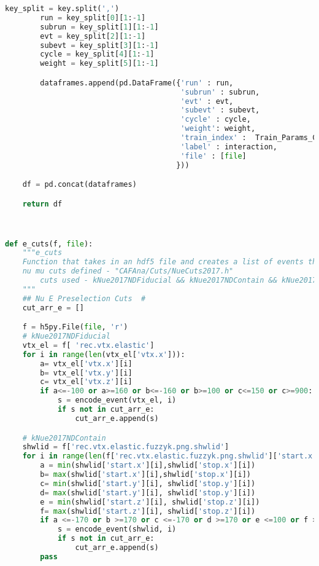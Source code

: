 \begin{lstlisting}[language=Python]
        key_split = key.split(',')
        run = key_split[0][1:-1]
        subrun = key_split[1][1:-1]
        evt = key_split[2][1:-1]
        subevt = key_split[3][1:-1]
        cycle = key_split[4][1:-1]
        weight = key_split[5][1:-1]

        dataframes.append(pd.DataFrame({'run' : run,
                                        'subrun' : subrun,
                                        'evt' : evt,
                                        'subevt' : subevt,
                                        'cycle' : cycle,
                                        'weight': weight,
                                        'train_index' :  Train_Params_Cut[key][0],
                                        'label' : interaction,
                                        'file' : [file]
                                       }))

    df = pd.concat(dataframes)

    return df



def e_cuts(f, file):
    """e_cuts
    Function that takes in an hdf5 file and creates a list of events that do not pass the nu e cuts:
    nu mu cuts defined - "CAFAna/Cuts/NueCuts2017.h"
        cuts used - kNue2017NDFiducial && kNue2017NDContain && kNue2017NDFrontPlanes
    """
    ## Nu E Preselection Cuts  #
    cut_arr_e = []

    f = h5py.File(file, 'r')
    # kNue2017NDFiducial
    vtx_el = f[ 'rec.vtx.elastic']
    for i in range(len(vtx_el['vtx.x'])):
        a= vtx_el['vtx.x'][i]
        b= vtx_el['vtx.y'][i]
        c= vtx_el['vtx.z'][i]
        if a<=-100 or a>=160 or b<=-160 or b>=100 or c<=150 or c>=900:
            s = encode_event(vtx_el, i)
            if s not in cut_arr_e:
                cut_arr_e.append(s)

    # kNue2017NDContain
    shwlid = f['rec.vtx.elastic.fuzzyk.png.shwlid']
    for i in range(len(f['rec.vtx.elastic.fuzzyk.png.shwlid']['start.x'])):
        a = min(shwlid['start.x'][i],shwlid['stop.x'][i])
        b= max(shwlid['start.x'][i],shwlid['stop.x'][i])
        c= min(shwlid['start.y'][i], shwlid['stop.y'][i])
        d= max(shwlid['start.y'][i], shwlid['stop.y'][i])
        e = min(shwlid['start.z'][i], shwlid['stop.z'][i])
        f= max(shwlid['start.z'][i], shwlid['stop.z'][i])
        if a <=-170 or b >=170 or c <=-170 or d >=170 or e <=100 or f >=1225:
            s = encode_event(shwlid, i)
            if s not in cut_arr_e:
                cut_arr_e.append(s)
        pass


\end{lstlisting}
